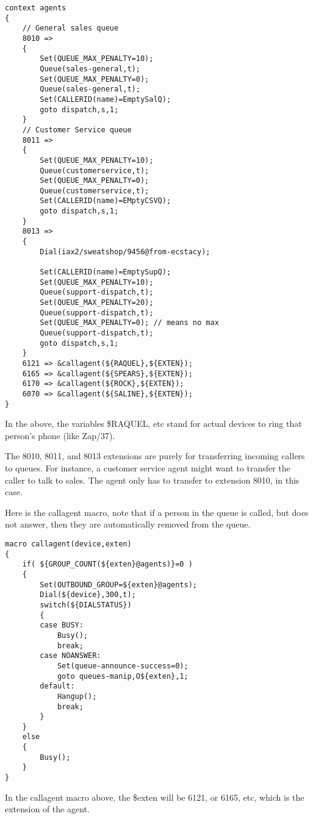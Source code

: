 \begin{astlisting}
\begin{verbatim}
context agents
{
	// General sales queue
	8010 =>
	{
		Set(QUEUE_MAX_PENALTY=10);
		Queue(sales-general,t);
		Set(QUEUE_MAX_PENALTY=0);
		Queue(sales-general,t);
		Set(CALLERID(name)=EmptySalQ);
		goto dispatch,s,1;
	}
	// Customer Service queue
	8011 =>
	{
		Set(QUEUE_MAX_PENALTY=10);
		Queue(customerservice,t);
		Set(QUEUE_MAX_PENALTY=0);
		Queue(customerservice,t);
		Set(CALLERID(name)=EMptyCSVQ);
		goto dispatch,s,1;
	}
	8013 =>
	{
		Dial(iax2/sweatshop/9456@from-ecstacy);

		Set(CALLERID(name)=EmptySupQ);
		Set(QUEUE_MAX_PENALTY=10);
		Queue(support-dispatch,t);
		Set(QUEUE_MAX_PENALTY=20);
		Queue(support-dispatch,t);
		Set(QUEUE_MAX_PENALTY=0); // means no max
		Queue(support-dispatch,t);
		goto dispatch,s,1;
	}
	6121 => &callagent(${RAQUEL},${EXTEN});
	6165 => &callagent(${SPEARS},${EXTEN});
	6170 => &callagent(${ROCK},${EXTEN});
	6070 => &callagent(${SALINE},${EXTEN});
}
\end{verbatim}
\end{astlisting}

In the above, the variables \${RAQUEL}, etc stand for
actual devices to ring that person's
phone (like Zap/37).

The 8010, 8011, and 8013 extensions are purely for transferring
incoming callers to queues. For instance, a customer service
agent might want to transfer the caller to talk to sales. The
agent only has to transfer to extension 8010, in this case.

Here is the callagent macro, note that if a person in the
queue is called, but does not answer, then they are automatically
removed from the queue.

\begin{astlisting}
\begin{verbatim}
macro callagent(device,exten)
{
	if( ${GROUP_COUNT(${exten}@agents)}=0 )
	{
		Set(OUTBOUND_GROUP=${exten}@agents);
		Dial(${device},300,t);
		switch(${DIALSTATUS})
		{
		case BUSY:
			Busy();
			break;
		case NOANSWER:
			Set(queue-announce-success=0);
			goto queues-manip,O${exten},1;
		default:
			Hangup();
			break;
		}
	}
	else
	{
		Busy();
	}
}
\end{verbatim}
\end{astlisting}

In the callagent macro above, the \${exten} will
be 6121, or 6165, etc, which is the extension of the agent.

